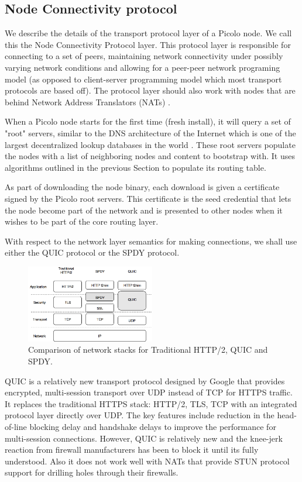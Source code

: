 \subsection{Node Connectivity protocol}
\label{net:net_proto}

We describe the details of the transport protocol layer of a Picolo node. We call this the Node Connectivity Protocol
layer. This protocol layer is responsible for connecting to a set of peers, maintaining network connectivity under
possibly varying network conditions and allowing for a peer-peer network programing model (as opposed to client-server
programming model which most transport protocols are based off).  The protocol layer should also work with nodes that
are behind Network Address Translators (NATs) \cite{nats}.

When a Picolo node starts for the first time (fresh install), it will query a set of "root" servers, similar to the DNS
architecture of the Internet which is one of the largest decentralized lookup databases in the world \cite{icann_root}. 
These root servers populate the nodes with a list of neighboring nodes and content to bootstrap with. It uses algorithms
outlined in the previous Section to populate its routing table.

As part of downloading the node binary, each download is given a certificate signed by the Picolo root servers. This
certificate is the seed credential that lets the node become part of the network and is presented to other nodes when it
wishes to be part of the core routing layer.

With respect to the network layer semantics for making connections, we shall use either the QUIC protocol or the SPDY
protocol.
\begin{figure}[h]
    \centering
    \includegraphics[width=0.5\textwidth]{fig/pic_netlayer.png}
  \caption{Comparison of network stacks for Traditional HTTP/2, QUIC and SPDY.}
\end{figure}

QUIC is a relatively new transport protocol designed by Google \cite{quic_sigcomm} that provides encrypted, multi-session transport over UDP
instead of TCP for HTTPS traffic. It replaces the traditional HTTPS stack: HTTP/2, TLS, TCP with an integrated protocol
layer directly over UDP. The key features include reduction in the head-of-line blocking delay and handshake delays to
improve the performance for multi-session connections. However, QUIC is relatively new and the knee-jerk reaction from
firewall manufacturers has been to block it until its fully understood. Also it does not work well with NATs that
provide STUN protocol \cite{stun_protocol} support for drilling holes through their firewalls.  

